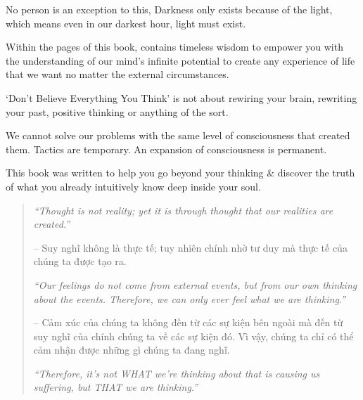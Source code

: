 \documentclass{article}
\begin{document}
\begin{enumerate}
	No person is an exception to this, Darkness only exists because of the light, which means even in our darkest hour, light must exist.

	Within the pages of this book, contains timeless wisdom to empower you with the understanding of our mind's infinite potential to create any experience of life that we want no matter the external circumstances.

	`Don't Believe Everything You Think' is not about rewiring your brain, rewriting your past, positive thinking or anything of the sort.

	We cannot solve our problems with the same level of consciousness that created them. Tactics are temporary. An expansion of consciousness is permanent.

	This book was written to help you go beyond your thinking \& discover the truth of what you already intuitively know deep inside your soul.
	\begin{quotation}
		{\it``Thought is not reality; yet it is through thought that our realities are created.''}

		-- Suy nghĩ không là thực tế; tuy nhiên chính nhờ tư duy mà thực tế của chúng ta được tạo ra.

		{\it``Our feelings do not come from external events, but from our own thinking about the events. Therefore, we can only ever feel what we are thinking.''}

		-- Cảm xúc của chúng ta không đến từ các sự kiện bên ngoài mà đến từ suy nghĩ của chính chúng ta về các sự kiện đó. Vì vậy, chúng ta chỉ có thể cảm nhận được những gì chúng ta đang nghĩ.

		{\it``Therefore, it's not WHAT we're thinking about that is causing us suffering, but THAT we are thinking.''}


\end{quotation}
\end{enumerate}
\end{document}
